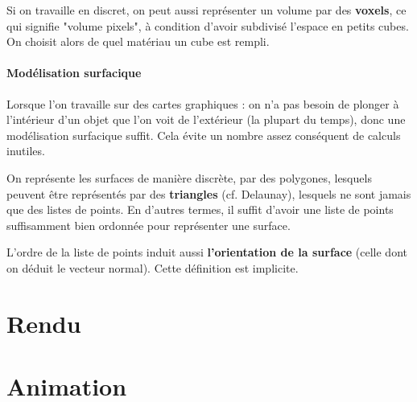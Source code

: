 \documentclass[a4paper, 10pt]{article}
\begin{document}
Si on travaille en discret, on peut aussi représenter un volume par des
\textbf{voxels}, ce qui signifie "volume pixels", à condition d'avoir subdivisé
l'espace en petits cubes. On choisit alors de quel matériau un cube est rempli.

\paragraph{Modélisation surfacique}
Lorsque l'on travaille sur des cartes graphiques : on n'a pas besoin de plonger
à l'intérieur d'un objet que l'on voit de l'extérieur (la plupart du temps),
donc une modélisation surfacique suffit. Cela évite un nombre assez conséquent
de calculs inutiles.

On représente les surfaces de manière discrète, par des polygones, lesquels
peuvent être représentés par des \textbf{triangles} (cf. Delaunay), lesquels 
ne sont jamais que des listes de points. En d'autres termes, il suffit d'avoir 
une liste de points suffisamment bien ordonnée pour représenter une surface.

L'ordre de la liste de points induit aussi \textbf{l'orientation de la surface} 
(celle dont on déduit le vecteur normal). Cette définition est implicite.



\section{Rendu}

\section{Animation}
\end{document}
